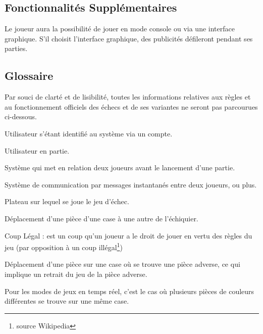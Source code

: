 \documentclass[10pt, a4paper]{article}
\begin{document}
			\subsection{Fonctionnalités Supplémentaires}
			Le joueur aura la possibilité de jouer en mode console ou via une interface graphique. S'il choisit l'interface graphique, des publicités défileront pendant ses parties.
		\subsection{Glossaire} Par souci de clarté et de lisibilité, toutes les informations relatives aux règles et au fonctionnement officiels des échecs et de ses variantes ne seront pas parcourues ci-dessous.
		\begin{description}
		\item[Un utilisateur :] Utilisateur s'étant identifié au système via un compte.
		\item[Joueur :] Utilisateur en partie.
		\item[Matchmaking :] Système qui met en relation deux joueurs avant le lancement d'une partie.
		\item[Chat :] Système de communication par messages instantanés entre deux joueurs, ou plus.
		\item[Echiquier (Board) :] Plateau sur lequel se joue le jeu d'échec.
		\item[Coup/Mouvement :] Déplacement d'une pièce d'une case à une autre de l'échiquier.
		\item{Coup Légal :} est un coup qu'un joueur a le droit de jouer en vertu des règles du jeu (par opposition à un coup illégal\footnote{source Wikipedia})
		\item[Prise :] Déplacement d'une pièce sur une case où se trouve une pièce adverse, ce qui implique un retrait du jeu de la pièce adverse.
		\item[Collision :] Pour les modes de jeux en temps réel, c'est le cas où plusieurs pièces de couleurs différentes se trouve sur une même case.

\end{description}
\end{document}

